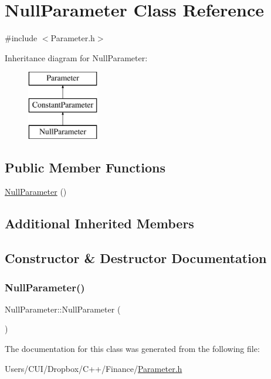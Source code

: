 \hypertarget{class_null_parameter}{}\section{Null\+Parameter Class Reference}
\label{class_null_parameter}


{\ttfamily \#include $<$Parameter.\+h$>$}

Inheritance diagram for Null\+Parameter\+:\begin{figure}[H]
\begin{center}
\leavevmode
\includegraphics[height=3.000000cm]{class_null_parameter}
\end{center}
\end{figure}
\subsection*{Public Member Functions}
\begin{DoxyCompactItemize}
\item 
\hyperlink{class_null_parameter_aa11a91b9c36438288e91fbc3613bcda7}{Null\+Parameter} ()
\end{DoxyCompactItemize}
\subsection*{Additional Inherited Members}


\subsection{Constructor \& Destructor Documentation}
\hypertarget{class_null_parameter_aa11a91b9c36438288e91fbc3613bcda7}{}\label{class_null_parameter_aa11a91b9c36438288e91fbc3613bcda7} 
\subsubsection{\texorpdfstring{Null\+Parameter()}{NullParameter()}}
{\footnotesize\ttfamily Null\+Parameter\+::\+Null\+Parameter (\begin{DoxyParamCaption}{ }\end{DoxyParamCaption})\hspace{0.3cm}{\ttfamily [inline]}}



The documentation for this class was generated from the following file\+:\begin{DoxyCompactItemize}
\item 
Users/\+C\+U\+I/\+Dropbox/\+C++/\+Finance/\hyperlink{_parameter_8h}{Parameter.\+h}\end{DoxyCompactItemize}
